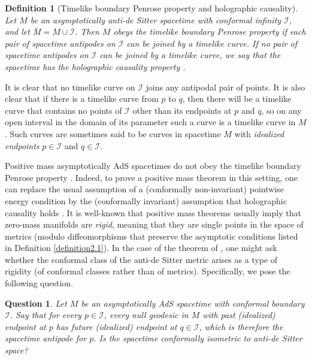 \documentclass[12pt]{amsart}
\numberwithin{equation}{section}
\newtheorem{definition}[theorem]{Definition}
\newtheorem{question}[theorem]{Question}
\begin{document}
\begin{definition}[Timelike boundary Penrose property and holographic causality]\label{definition1.1}
Let $M$ be an asymptotically anti-de Sitter spacetime with conformal infinity ${\mathcal I}$, and let ${\bar M}=M\cup{\mathcal I}$. Then $M$ obeys the \emph{timelike boundary Penrose property} \cite{Cameron} if each pair of spacetime antipodes on ${\mathcal I}$ can be joined by a timelike curve. If no pair of spacetime antipodes on ${\mathcal I}$ can be joined by a timelike curve, we say that the spacetime has the \emph{holographic causality} property \cite{PSW}.
\end{definition}

It is clear that no timelike curve on ${\mathcal I}$ joins any antipodal pair of points. It is also clear that if there is a timelike curve from $p$ to $q$, then there will be a timelike curve that contains no points of ${\mathcal I}$ other than its endpoints at $p$ and $q$, so on any open interval in the domain of its parameter such a curve is a timelike curve in $M$. Such curves are sometimes said to be curves in spacetime $M$ with \emph{idealized endpoints} $p\in{\mathcal I}$ and $q\in{\mathcal I}$.

Positive mass asymptotically AdS spacetimes do not obey the timelike boundary Penrose property \cite{Woolgar}. Indeed, to prove a positive mass theorem in this setting, one can replace the usual assumption of a (conformally non-invariant) pointwise energy condition by the (conformally invariant) assumption that holographic causality holds \cite{PSW}. It is well-known that positive mass theorems usually imply that zero-mass manifolds are \emph{rigid}, meaning that they are single points in the space of metrics (modulo diffeomorphisms that preserve the asymptotic conditions listed in Definition \ref{definition2.1}). In the case of the theorem of \cite{PSW}, one might ask whether the conformal class of the anti-de Sitter metric arises as a type of rigidity (of conformal classes rather than of metrics). Specifically, we pose the following question.

\begin{question}\label{question1.2}
Let $M$ be an %
asymptotically AdS spacetime with conformal boundary ${\mathcal I}$. Say that for every $p\in {\mathcal I}$, every null geodesic in $M$ with past (idealized) endpoint at $p$ has future (idealized) endpoint at $q\in {\mathcal I}$, which is therefore the spacetime antipode for $p$. Is the spacetime conformally isometric to anti-de Sitter space?
\end{question}
\end{document}
